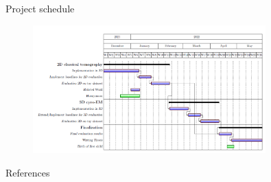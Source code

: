 \documentclass[aspectratio=169]{beamer}
\begin{document}
\begin{frame}{Project schedule}
    \begin{figure}
        \includegraphics[width=0.8\textwidth]{gantt_chart}
    \end{figure}
\end{frame}

\begin{frame}[t,plain]
\end{frame}

\backupbegin

\begin{frame}{References}
    \printbibliography
\end{frame}

\backupend
\end{document}
